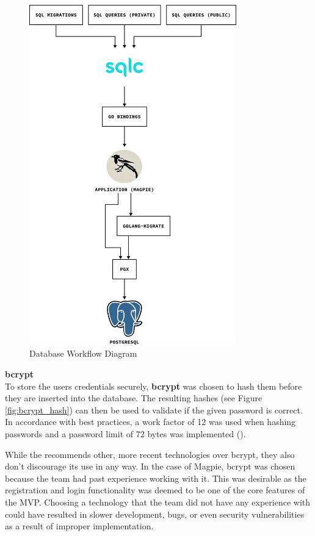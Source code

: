 \begin{figure}[htbp]
  \centering{}
  \includegraphics[width=0.8\textwidth]{../d2-diagrams/database-workflow/database_workflow.png}
  \caption{Database Workflow Diagram}
  \label{fig:database_workflow_diagram}
\end{figure}

\textbf{bcrypt}\\
To store the users credentials securely, \textbf{bcrypt} was chosen to hash them
before they are inserted into the database. The resulting hashes (see Figure
\ref{fig:bcrypt_hash}) can then be used to validate if the given password is
correct. In accordance with best practices, a work factor of 12 was used when
hashing passwords and a password limit of 72 bytes was implemented
(\cite{owasp_password_storage_cheatsheet}).

While the \textcite{owasp_password_storage_cheatsheet} recommends other, more
recent technologies over bcrypt, they also don't discourage its use in any way.
In the case of Magpie, bcrypt was chosen because the team had past experience
working with it. This was desirable as the registration and login functionality
was deemed to be one of the core features of the MVP. Choosing a technology that
the team did not have any experience with could have resulted in slower
development, bugs, or even security vulnerabilities as a result of improper
implementation.

